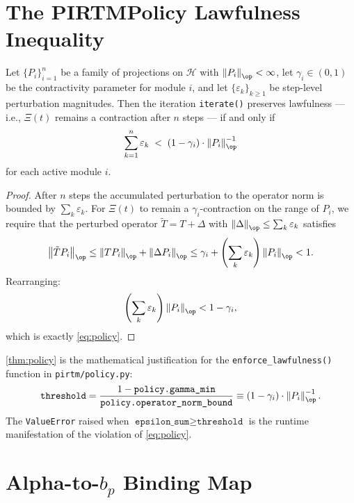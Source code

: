 \documentclass[12pt,letterpaper]{article}
\theoremstyle{definition}
\theoremstyle{remark}
\newcommand{\HH}{\mathcal{H}}
\newcommand{\norm}[1]{\left\|#1\right\|}
\begin{document}
\section{The PIRTMPolicy Lawfulness Inequality}
\label{app:policy}

\begin{apptheorem}
\label{thm:policy}
Let $\{P_i\}_{i=1}^n$ be a family of projections on $\HH$ with
$\norm{P_i}_{\op} < \infty$, let $\gamma_i \in (0,1)$ be the contractivity
parameter for module $i$, and let $\{\varepsilon_k\}_{k \geq 1}$ be
step-level perturbation magnitudes. Then the iteration \texttt{iterate()}
preserves lawfulness --- i.e., $\Xi(t)$ remains a contraction after $n$
steps --- if and only if
\begin{equation}
  \sum_{k=1}^n \varepsilon_k
  \;<\;
  (1 - \gamma_i) \cdot \norm{P_i}_{\op}^{-1}
  \label{eq:policy}
\end{equation}
for each active module $i$.
\end{apptheorem}

\begin{proof}
After $n$ steps the accumulated perturbation to the operator norm is bounded
by $\sum_k \varepsilon_k$. For $\Xi(t)$ to remain a $\gamma_i$-contraction
on the range of $P_i$, we require that the perturbed operator
$\tilde T = T + \Delta$ with $\norm{\Delta}_{\op} \leq \sum_k \varepsilon_k$
satisfies
\[
  \norm{\tilde T P_i}_{\op}
  \leq \norm{T P_i}_{\op} + \norm{\Delta P_i}_{\op}
  \leq \gamma_i + \left(\sum_k \varepsilon_k\right)\norm{P_i}_{\op}
  < 1.
\]
Rearranging:
\[
  \left(\sum_k \varepsilon_k\right)\norm{P_i}_{\op}
  < 1 - \gamma_i,
\]
which is exactly \eqref{eq:policy}.
\end{proof}

\begin{appremark}
\cref{thm:policy} is the mathematical justification for the
\texttt{enforce\_lawfulness()} function in \texttt{pirtm/policy.py}:
\[
  \texttt{threshold}
  = \frac{1 - \texttt{policy.gamma\_min}}{\texttt{policy.operator\_norm\_bound}}
  \equiv
  (1 - \gamma_i) \cdot \norm{P_i}_{\op}^{-1}.
\]
The \texttt{ValueError} raised when
$\texttt{epsilon\_sum} \geq \texttt{threshold}$ is the runtime
manifestation of the violation of \eqref{eq:policy}.
\end{appremark}

\section{Alpha-to-\texorpdfstring{$b_p$}{b\_p} Binding Map}
\label{app:alpha-bp}
\end{document}
